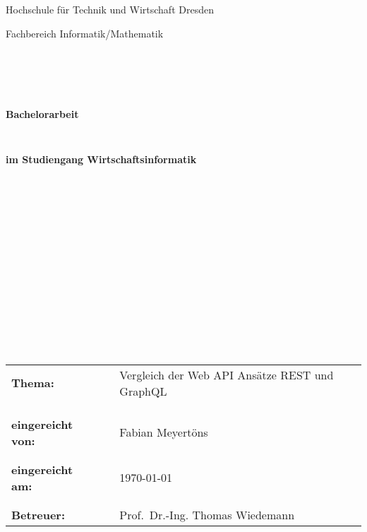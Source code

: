 \thispagestyle{empty}
\begin{center}
\Large{Hochschule für Technik und Wirtschaft Dresden}\\
\end{center}


\begin{center}
\Large{Fachbereich Informatik/Mathematik}
\end{center}
\begin{verbatim}





\end{verbatim}
\begin{center}
\textbf{\LARGE{Bachelorarbeit}}
\end{center}
\begin{verbatim}


\end{verbatim}
\begin{center}
\textbf{im Studiengang Wirtschaftsinformatik}
\end{center}
\begin{verbatim}
















\end{verbatim}

\begin{flushleft}
\begin{tabular}{lll}
\textbf{Thema:} & & Vergleich der Web API Ansätze REST und GraphQL\\
& & \\
& & \\
& & \\
\textbf{eingereicht von:} & & Fabian Meyertöns\\
& & \\
& & \\
\textbf{eingereicht am:} & & \today \\
& & \\
& & \\
\textbf{Betreuer:} & & Prof.\ Dr.-Ing. Thomas Wiedemann
\end{tabular}
\end{flushleft}